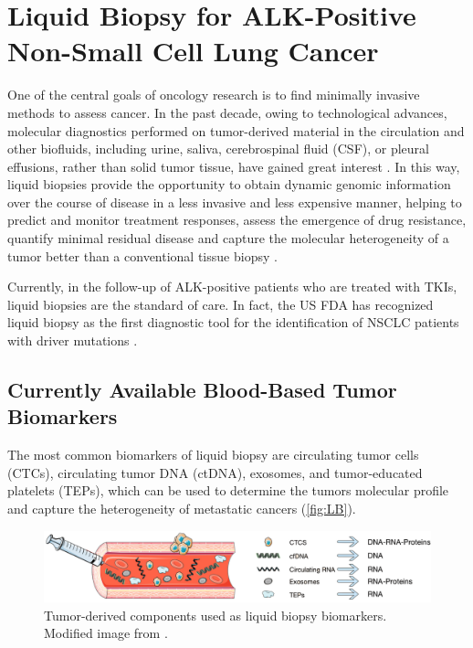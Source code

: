 \section{Liquid Biopsy for ALK-Positive Non-Small Cell Lung Cancer}

One of the central goals of oncology research is to find minimally invasive methods to assess cancer. In the past decade, owing to technological advances, molecular diagnostics performed on tumor-derived material in the circulation and other biofluids, including urine, saliva, cerebrospinal fluid (CSF), or pleural effusions, rather than solid tumor tissue, have gained great interest \cite{NSCLC_drivers}. In this way, liquid biopsies provide the opportunity to obtain dynamic genomic information over the course of disease in a less invasive and less expensive manner, helping to predict and monitor treatment responses, assess the emergence of drug resistance, quantify minimal residual disease and capture the molecular heterogeneity of a tumor better than a conventional tissue biopsy \cite{ALK_types_resistance, Liquid_biopsy_NSLC}.

Currently, in the follow-up of ALK-positive patients who are treated with TKIs, liquid biopsies are the standard of care. In fact, the US FDA has recognized liquid biopsy as the first diagnostic tool for the identification of NSCLC patients with driver mutations \cite{Liquid_biopsy_NSLC}.

\subsection{Currently Available Blood-Based Tumor Biomarkers}

The most common biomarkers of liquid biopsy are circulating tumor cells (CTCs), circulating tumor DNA (ctDNA), exosomes, and tumor-educated platelets (TEPs), which can be used to determine the tumors molecular profile and capture the heterogeneity of metastatic cancers (\autoref{fig:LB}).

\begin{figure}[ht]
    \centering
    \includegraphics[width=\textwidth]{Images/chapter_1/liquid_biopsy.png}
    \caption{Tumor-derived components used as liquid biopsy biomarkers. Modified image from \cite{LB_ed}.}
    \label{fig:LB}
\end{figure}

